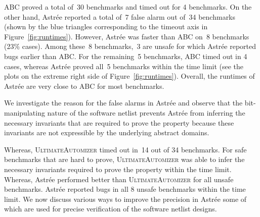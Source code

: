%
ABC proved a total of~30 benchmarks and timed out for 4 benchmarks.  
On the other hand, Astr{\'e}e reported a total of~7 false alarm out of~34 
benchmarks (shown by the blue triangles corresponding to the timeout axis in 
Figure~\ref{fig:runtimes}). However, Astr{\'e}e was faster than ABC on~8 benchmarks (23\% cases).
%
Among these~8 benchmarks,~3 are unsafe for which Astr{\'e}e reported bugs
earlier than ABC. For the remaining~5 benchmarks, ABC timed out in 4 cases, 
whereas Astr{\'e}e proved all~5 benchmarks within the time limit (see the plots 
on the extreme right side of Figure~\ref{fig:runtimes}).  
%
Overall, the runtimes of Astr{\'e}e are very close to ABC for most benchmarks. 
%

We investigate the reason for the false alarms in Astr{\'e}e and observe that 
the bit-manipulating nature of the software netlist prevents Astr{\'e}e from 
inferring the necessary invariants that are required to prove the property 
because these invariants are not expressible by the underlying abstract domains. 

Whereas, \textsc{UltimateAutomizer} timed out in~14 
out of 34 benchmarks. For safe benchmarks that are hard to prove, \textsc{UltimateAutomizer} 
was able to infer the necessary invariants required to prove the property within 
the time limit. 
Whereas, Astr{\'e}e performed better than \textsc{UltimateAutomizer} for all 
unsafe benchmarks.  Astr{\'e}e reported bugs in all 8 unsafe benchmarks within 
the time limit.  We now discuss various ways to improve the precision in
Astr{\'e}e some of which are used for precise verification of the software
netlist designs. 


